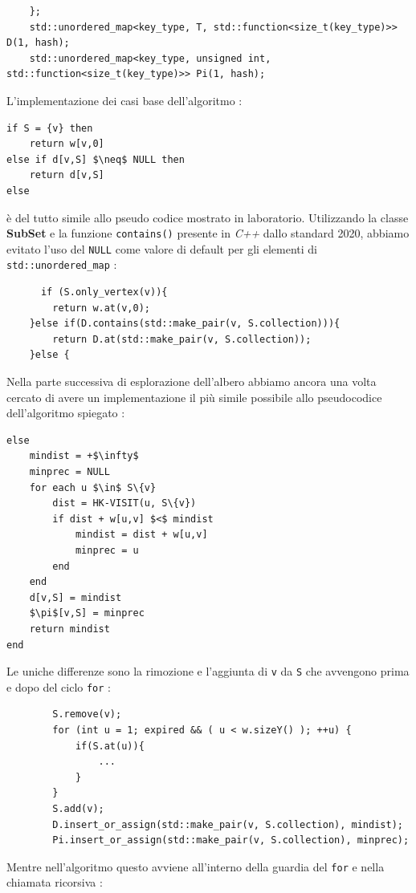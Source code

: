 \documentclass[]{article}
\begin{document}
\begin{flushleft}
\begin{lstlisting}
    };
    std::unordered_map<key_type, T, std::function<size_t(key_type)>> D(1, hash);
    std::unordered_map<key_type, unsigned int, std::function<size_t(key_type)>> Pi(1, hash);
\end{lstlisting}
\medskip
L'implementazione dei casi base dell'algoritmo : 
\begin{lstlisting}[mathescape=true]
if S = {v} then
	return w[v,0]
else if d[v,S] $\neq$ NULL then
	return d[v,S]
else
\end{lstlisting}
è del tutto simile allo pseudo codice mostrato in laboratorio. Utilizzando la classe \textbf{SubSet} e la funzione \verb|contains()| presente in \textit{C++} dallo standard 2020, abbiamo evitato l'uso del \verb|NULL| come valore di default per gli elementi di \verb|std::unordered_map| :
\lstset{language=c++, style=mystyle, firstnumber=6}
\begin{lstlisting}
	  if (S.only_vertex(v)){
        return w.at(v,0);
    }else if(D.contains(std::make_pair(v, S.collection))){
        return D.at(std::make_pair(v, S.collection));
    }else {
\end{lstlisting}
\medskip
Nella parte successiva di esplorazione dell'albero abbiamo ancora una volta cercato di avere un implementazione il più simile possibile allo pseudocodice dell'algoritmo spiegato :
\begin{lstlisting}[mathescape=true]
else
	mindist = +$\infty$
	minprec = NULL
	for each u $\in$ S\{v}
		dist = HK-VISIT(u, S\{v})
		if dist + w[u,v] $<$ mindist
			mindist = dist + w[u,v]
			minprec = u
		end
	end
	d[v,S] = mindist
	$\pi$[v,S] = minprec
	return mindist
end
\end{lstlisting}
Le uniche differenze sono la rimozione e l'aggiunta di \verb|v| da \verb|S| che avvengono prima e dopo del ciclo \verb|for| :
\lstset{language=c++, style=mystyle, firstnumber=26}
\begin{lstlisting}
        S.remove(v);
        for (int u = 1; expired && ( u < w.sizeY() ); ++u) {
        	if(S.at(u)){
            	...
            }
        }
        S.add(v);
        D.insert_or_assign(std::make_pair(v, S.collection), mindist);
        Pi.insert_or_assign(std::make_pair(v, S.collection), minprec);
\end{lstlisting}
Mentre nell'algoritmo questo avviene all'interno della guardia del \verb|for| e nella chiamata ricorsiva :

\end{flushleft}
\end{document}
